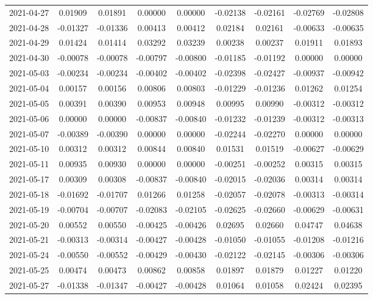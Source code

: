 \begin{footnotesize}
\begin{longtable}{lcccccccc}
2021-04-27 & 0.01909 & 0.01891 & 0.00000 & 0.00000 & -0.02138 & -0.02161 & -0.02769 & -0.02808 \\
2021-04-28 & -0.01327 & -0.01336 & 0.00413 & 0.00412 & 0.02184 & 0.02161 & -0.00633 & -0.00635 \\
2021-04-29 & 0.01424 & 0.01414 & 0.03292 & 0.03239 & 0.00238 & 0.00237 & 0.01911 & 0.01893 \\
2021-04-30 & -0.00078 & -0.00078 & -0.00797 & -0.00800 & -0.01185 & -0.01192 & 0.00000 & 0.00000 \\
2021-05-03 & -0.00234 & -0.00234 & -0.00402 & -0.00402 & -0.02398 & -0.02427 & -0.00937 & -0.00942 \\
2021-05-04 & 0.00157 & 0.00156 & 0.00806 & 0.00803 & -0.01229 & -0.01236 & 0.01262 & 0.01254 \\
2021-05-05 & 0.00391 & 0.00390 & 0.00953 & 0.00948 & 0.00995 & 0.00990 & -0.00312 & -0.00312 \\
2021-05-06 & 0.00000 & 0.00000 & -0.00837 & -0.00840 & -0.01232 & -0.01239 & -0.00312 & -0.00313 \\
2021-05-07 & -0.00389 & -0.00390 & 0.00000 & 0.00000 & -0.02244 & -0.02270 & 0.00000 & 0.00000 \\
2021-05-10 & 0.00312 & 0.00312 & 0.00844 & 0.00840 & 0.01531 & 0.01519 & -0.00627 & -0.00629 \\
2021-05-11 & 0.00935 & 0.00930 & 0.00000 & 0.00000 & -0.00251 & -0.00252 & 0.00315 & 0.00315 \\
2021-05-17 & 0.00309 & 0.00308 & -0.00837 & -0.00840 & -0.02015 & -0.02036 & 0.00314 & 0.00314 \\
2021-05-18 & -0.01692 & -0.01707 & 0.01266 & 0.01258 & -0.02057 & -0.02078 & -0.00313 & -0.00314 \\
2021-05-19 & -0.00704 & -0.00707 & -0.02083 & -0.02105 & -0.02625 & -0.02660 & -0.00629 & -0.00631 \\
2021-05-20 & 0.00552 & 0.00550 & -0.00425 & -0.00426 & 0.02695 & 0.02660 & 0.04747 & 0.04638 \\
2021-05-21 & -0.00313 & -0.00314 & -0.00427 & -0.00428 & -0.01050 & -0.01055 & -0.01208 & -0.01216 \\
2021-05-24 & -0.00550 & -0.00552 & -0.00429 & -0.00430 & -0.02122 & -0.02145 & -0.00306 & -0.00306 \\
2021-05-25 & 0.00474 & 0.00473 & 0.00862 & 0.00858 & 0.01897 & 0.01879 & 0.01227 & 0.01220 \\
2021-05-27 & -0.01338 & -0.01347 & -0.00427 & -0.00428 & 0.01064 & 0.01058 & 0.02424 & 0.02395 \\

\end{longtable}
\end{footnotesize}
